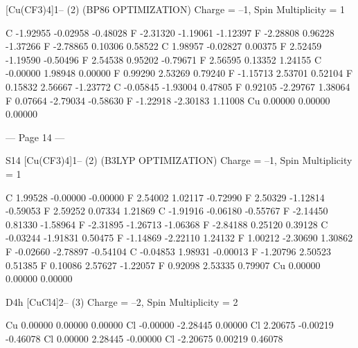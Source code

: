 [Cu(CF3)4]1– (2) (BP86 OPTIMIZATION) 
Charge = –1, Spin Multiplicity = 1 
 
C         -1.92955       -0.02958       -0.48028 
F         -2.31320       -1.19061       -1.12397 
F         -2.28808        0.96228       -1.37266 
F         -2.78865        0.10306        0.58522 
C          1.98957       -0.02827        0.00375 
F          2.52459       -1.19590       -0.50496 
F          2.54538        0.95202       -0.79671 
F          2.56595        0.13352        1.24155 
C         -0.00000        1.98948        0.00000 
F          0.99290        2.53269        0.79240 
F         -1.15713        2.53701        0.52104 
F          0.15832        2.56667       -1.23772 
C         -0.05845       -1.93004        0.47805 
F          0.92105       -2.29767        1.38064 
F          0.07664       -2.79034       -0.58630 
F         -1.22918       -2.30183        1.11008 
Cu         0.00000        0.00000        0.00000 
 
 


--- Page 14 ---
 
S14 
[Cu(CF3)4]1– (2) (B3LYP OPTIMIZATION) 
Charge = –1, Spin Multiplicity = 1 
 
C          1.99528       -0.00000       -0.00000 
F          2.54002        1.02117       -0.72990 
F          2.50329       -1.12814       -0.59053 
F          2.59252        0.07334        1.21869 
C         -1.91916       -0.06180       -0.55767 
F         -2.14450        0.81330       -1.58964 
F         -2.31895       -1.26713       -1.06368 
F         -2.84188        0.25120        0.39128 
C         -0.03244       -1.91831        0.50475 
F         -1.14869       -2.22110        1.24132 
F          1.00212       -2.30690        1.30862 
F         -0.02660       -2.78897       -0.54104 
C         -0.04853        1.98931       -0.00013 
F         -1.20796        2.50523        0.51385 
F          0.10086        2.57627       -1.22057 
F          0.92098        2.53335        0.79907 
Cu         0.00000        0.00000        0.00000 
 
D4h [CuCl4]2– (3) 
Charge = –2, Spin Multiplicity = 2 
 
Cu         0.00000        0.00000        0.00000 
Cl        -0.00000       -2.28445        0.00000 
Cl         2.20675       -0.00219       -0.46078 
Cl         0.00000        2.28445       -0.00000 
Cl        -2.20675        0.00219        0.46078 
 
 
 
 
 
